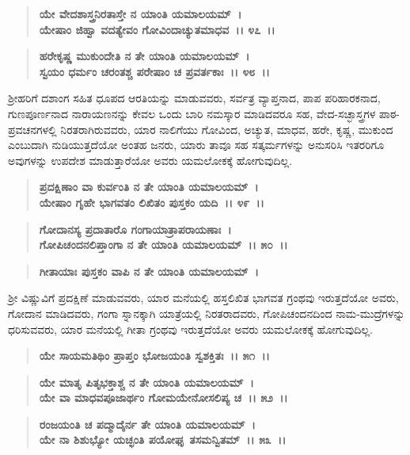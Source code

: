 \begin{verse}
\textbf{ಯೇ ವೇದಶಾಸ್ತ್ರನಿರತಾಸ್ತೇ ನ ಯಾಂತಿ ಯಮಾಲಯಮ್~।}\\\textbf{ಯೇಷಾಂ ಜಿಹ್ವಾ ವದತ್ಯೇವಂ ಗೋವಿಂದಾಚ್ಯುತಮಾಧವ~।। ೪೭~।।}
\end{verse}

\begin{verse}
\textbf{ಹರೇಕೃಷ್ಣ ಮುಕುಂದೇತಿ ನ ತೇ ಯಾಂತಿ ಯಮಾಲಯಮ್~।}\\\textbf{ಸ್ವಯಂ ಧರ್ಮಂ ಚರಂತಶ್ಚ ಪರೇಷಾಂ ಚ ಪ್ರವರ್ತಕಾಃ~।। ೪೮~।।}
\end{verse}

ಶ‍್ರೀಹರಿಗೆ ದಶಾಂಗ ಸಹಿತ ಧೂಪದ ಆರತಿಯನ್ನು ಮಾಡುವವರು, ಸರ್ವತ್ರ ವ್ಯಾಪ್ತನಾದ, ಪಾಪ ಪರಿಹಾರಕನಾದ, ಗುಣಪೂರ್ಣನಾದ ನಾರಾಯಣನನ್ನು ಕೇವಲ ಒಂದು ಬಾರಿ ನಮಸ್ಕಾರ ಮಾಡಿದವರೂ ಸಹ, ವೇದ-ಸಚ್ಛಾಸ್ತ್ರಗಳ ಪಾಠ-ಪ್ರವಚನಗಳಲ್ಲಿ ನಿರತರಾಗಿರುವವರು, ಯಾರ ನಾಲಿಗೆಯು ಗೋವಿಂದ, ಅಚ್ಯುತ, ಮಾಧವ, ಹರೇ, ಕೃಷ್ಣ, ಮುಕುಂದ ಎಂಬುದಾಗಿ ನುಡಿಯುತ್ತದೆಯೋ ಅಂತಹ ಜನರು, ಯಾರು ತಾವೂ ಸಹ ಸತ್ಕರ್ಮಗಳನ್ನು ಅನುಸರಿಸಿ ಇತರರಿಗೂ ಅವುಗಳನ್ನು ಉಪದೇಶ ಮಾಡುತ್ತಾರೆಯೋ ಅವರು ಯಮಲೋಕಕ್ಕೆ ಹೋಗುವುದಿಲ್ಲ.

\begin{verse}
\textbf{ಪ್ರದಕ್ಷಿಣಾಂ ವಾ ಕುರ್ವಂತಿ ನ ತೇ ಯಾಂತಿ ಯಮಾಲಯಮ್~।}\\\textbf{ಯೇಷಾಂ ಗೃಹೇ ಭಾಗವತಂ ಲಿಖಿತಂ ಪುಸ್ತಕಂ ಯದಿ~।। ೪೯~।। }
\end{verse}

\begin{verse}
\textbf{ಗೋದಾನಸ್ಯ ಪ್ರದಾತಾರೊ ಗಂಗಾಯಾತ್ರಾಪರಾಯಣಾಃ~।}\\\textbf{ಗೋಪಿಚಂದನಲಿಪ್ತಾಂಗಾ ನ ತೇ ಯಾಂತಿ ಯಮಾಲಯಮ್~।। ೫೦~।। }
\end{verse}

\begin{verse}
\textbf{ಗೀತಾಯಾಃ ಪುಸ್ತಕಂ ವಾಪಿ ನ ತೇ ಯಾಂತಿ ಯಮಾಲಯಮ್~।}
\end{verse}

ಶ‍್ರೀ ವಿಷ್ಣುವಿಗೆ ಪ್ರದಕ್ಷಿಣೆ ಮಾಡುವವರು, ಯಾರ ಮನೆಯಲ್ಲಿ ಹಸ್ತಲಿಖಿತ ಭಾಗವತ ಗ್ರಂಥವು ಇರುತ್ತದೆಯೋ ಅವರು, ಗೋದಾನ ಮಾಡಿದವರು, ಗಂಗಾ ಸ್ನಾನಕ್ಕಾಗಿ ಯಾತ್ರೆಯಲ್ಲಿ ನಿರತರಾದವರು, ಗೋಪಿಚಂದನದಿಂದ ನಾಮ-ಮುದ್ರೆಗಳನ್ನು ಧರಿಸುವವರು, ಯಾರ ಮನೆಯಲ್ಲಿ ಗೀತಾ ಗ್ರಂಥವು ಇರುತ್ತದೆಯೋ ಅವರು ಯಮಲೋಕಕ್ಕೆ ಹೋಗುವುದಿಲ್ಲ.

\begin{verse}
\textbf{ಯೇ ಸಾಯಮತಿಥಿಂ ಪ್ರಾಪ್ತಂ ಭೋಜಯಂತಿ ಸ್ವಶಕ್ತಿತಃ~।। ೫೧~।।} 
\end{verse}

\begin{verse}
\textbf{ಯೇ ಮಾತೃ ಪಿತೃಭಕ್ತಾಶ್ಚ ನ ತೇ ಯಾಂತಿ ಯಮಾಲಯಮ್~।}\\\textbf{ಯೇ ವಾ ಮಾಧವಪೂಜಾರ್ಥಂ ಗೋಮಯೇನೋಸಲಿಪ್ಯ ಚ~।। ೫೨~।। }
\end{verse}

\begin{verse}
\textbf{ರಂಜಯಂತಿ ಚ ಪದ್ಮಾದೈರ್ನ ತೇ ಯಾಂತಿ ಯಮಾಲಯಮ್~।}\\\textbf{ಯೇ ನಾ ಶಿಶುಭ್ಯೋ ಯಚ್ಛಂತಿ ಪಯೋಘೃ ತಸಮನ್ವಿತಮ್~।। ೫೩~।।}
\end{verse}

